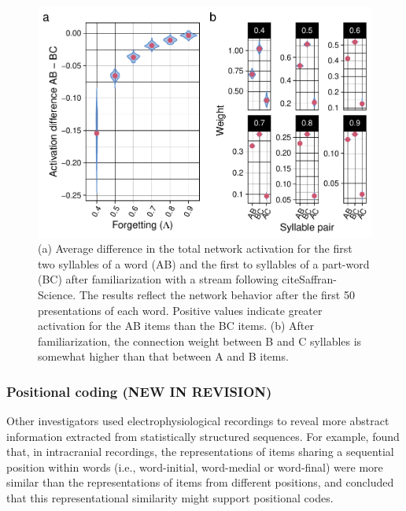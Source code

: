 \documentclass[
]{article}
\begin{document}
\begin{figure}
\includegraphics[width=1\linewidth]{tp_model_entrainment_files/figure-latex/basic-experiment-global-print-act-and-weight-after-2syll-plot-1} \caption{(a) Average difference in the total network activation for the first two syllables of a word (AB) and the first to syllables of a part-word (BC) after familiarization with a stream following cite{Saffran-Science}. The results reflect the network behavior after the first 50 presentations of each word. Positive values indicate greater activation for the AB items than the BC items. (b) After familiarization, the connection weight between B and C syllables is somewhat higher than that between A and B items.}\label{fig:basic-experiment-global-print-act-and-weight-after-2syll-plot}
\end{figure}

\clearpage

\hypertarget{positional-coding-new-in-revision}{%
\subsubsection{Positional coding (NEW IN
REVISION)}\label{positional-coding-new-in-revision}}

Other investigators used electrophysiological recordings to reveal more
abstract information extracted from statistically structured sequences.
For example, \citep{Henin2021} found that, in intracranial recordings,
the representations of items sharing a sequential position within words
(i.e., word-initial, word-medial or word-final) were more similar than
the representations of items from different positions, and concluded
that this representational similarity might support positional codes.
\end{document}
